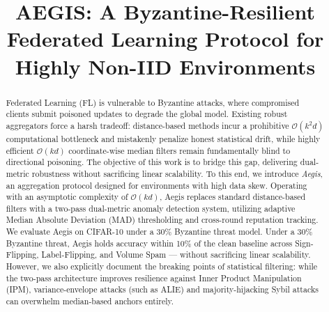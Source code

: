 \documentclass[10pt, conference]{IEEEtran}
\begin{document}
\title{AEGIS: A Byzantine-Resilient Federated Learning Protocol for Highly Non-IID Environments}

\author{
\and
{}
}

\maketitle

\begin{abstract}
Federated Learning (FL) is vulnerable to Byzantine attacks, where compromised clients submit poisoned updates to degrade the global model. Existing robust aggregators force a harsh tradeoff: distance-based methods incur a prohibitive $\mathcal{O}(k^2d)$ computational bottleneck and mistakenly penalize honest statistical drift, while highly efficient $\mathcal{O}(kd)$ coordinate-wise median filters remain fundamentally blind to directional poisoning. The objective of this work is to bridge this gap, delivering dual-metric robustness without sacrificing linear scalability. To this end, we introduce \textit{Aegis}, an aggregation protocol designed for environments with high data skew. Operating with an asymptotic complexity of $\mathcal{O}(kd)$, Aegis replaces standard distance-based filters with a two-pass dual-metric anomaly detection system, utilizing adaptive Median Absolute Deviation (MAD) thresholding and cross-round reputation tracking. We evaluate Aegis on CIFAR-10 under a 30\% Byzantine threat model. Under a 30\% Byzantine threat, Aegis holds accuracy within 10\% of the clean baseline across Sign-Flipping, Label-Flipping, and Volume Spam — without sacrificing linear scalability. However, we also explicitly document the breaking points of statistical filtering: while the two-pass architecture improves resilience against Inner Product Manipulation (IPM), variance-envelope attacks (such as ALIE) and majority-hijacking Sybil attacks can overwhelm median-based anchors entirely.
\end{abstract}
\end{document}
